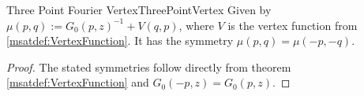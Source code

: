 \begin{msatdef}{Three Point Fourier Vertex}{ThreePointVertex}
    Given by $\mu(p,q) := G_0(p,z)^{-1} + V(q,p)$, where $V$ is the vertex function from \ref{msatdef:VertexFunction}. It has the symmetry $\mu(p,q) = \mu(-p,-q)$.
\end{msatdef}
\begin{proof}
    The stated symmetries follow directly from theorem \ref{msatdef:VertexFunction} and $G_0(-p,z) = G_0(p,z)$.
\end{proof}